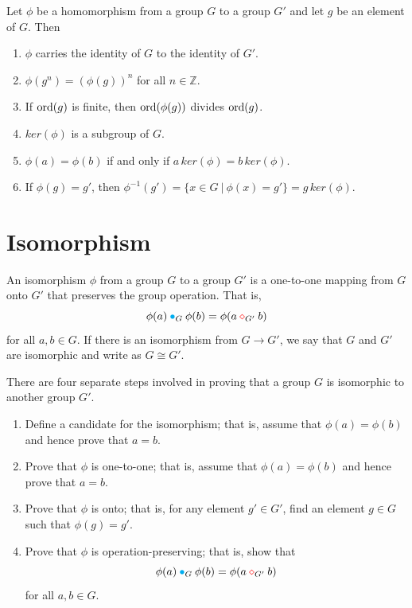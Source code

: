 \begin{theorem}
    Let $\phi$ be a homomorphism from a group $G$ to a group $G'$ and let $g$ be an element of $G$. Then
    \begin{enumerate}
        \item $\phi$ carries the identity of $G$ to the identity of $G'$.
        \item $\phi(g^n) = \left( \phi(g) \right)^n$ for all $n \in \mathbb{Z}$.
        \item If $\operatorname{ord}(g)$ is finite, then $\operatorname{ord}(\phi(g))$ divides $\operatorname{ord}(g)$.
        \item $ker(\phi)$ is a subgroup of $G$.
        \item $\phi(a) = \phi(b)$ if and only if $a\, ker(\phi) = b\, ker(\phi)$.
        \item If $\phi(g)= g'$, then $\phi^{-1}(g') = \{ x \in G \> | \> \phi(x) = g' \} = g\, ker(\phi)$.
    \end{enumerate}
\end{theorem}

\section{Isomorphism}
\begin{definition}
    An isomorphism $\phi$ from a group $G$ to a group $G'$ is a one-to-one 
mapping from $G$ onto $G'$ that preserves the group operation. That is, 
\[
    \phi(a) \> {\color{cyan} \bullet}_G \> \phi(b) = \phi(a \> {\color{red} \diamond}_{G'} \> b)
\]
for all $a,b \in G$. If there is an isomorphism from $G \to G'$, we say that $G$ and $G'$ are isomorphic 
and write as $G \cong G'$.
\end{definition}

There are four separate steps involved in proving that a group $G$ is isomorphic to another group $G'$.
\begin{enumerate}
    \item Define a candidate for the isomorphism; that is, assume that $\phi(a) = \phi(b)$ and hence prove that 
        $a=b$.
    \item Prove that $\phi$ is one-to-one; that is, assume that $\phi(a) = \phi(b)$ and hence 
    prove that $a=b$.
    \item  Prove that $\phi$ is onto; that is, for any element $g' \in G'$, find an element $g \in G$
    such that $\phi(g) = g'$.
    \item Prove that $\phi$ is operation-preserving; that is, show that 
    \[
        \phi(a) \> {\color{cyan} \bullet}_G \> \phi(b) = \phi(a \> {\color{red} \diamond}_{G'} \> b)
    \]
    for all $a, b \in G$. 
\end{enumerate}

